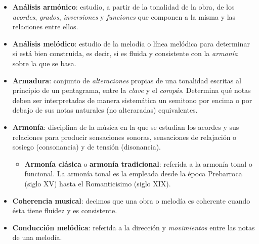 \begin{itemize}[label={}, leftmargin=*]
\begin{itemize}
	\end{itemize}

	\bigskip

	\label{armonico}
	\item \textbf{Análisis armónico}: estudio, a partir de la tonalidad de la obra, de los \textit{acordes}, \textit{grados}, \textit{inversiones} y \textit{funciones} que componen a la misma y las relaciones entre ellos.

	\bigskip

	\label{melodico}
	\item \textbf{Análisis melódico}: estudio de la melodía o línea melódica para determinar si está bien construida, es decir, si es fluida y consistente con la \textit{armonía} sobre la que se basa.

	\bigskip

	\label{armadura}
	\item \textbf{Armadura}: conjunto de \textit{alteraciones} propias de una tonalidad escritas al principio de un pentagrama, entre la \textit{clave} y el \textit{compás}. Determina qué notas deben ser interpretadas de manera sistemática un semitono por encima o por debajo de sus notas naturales (no alteraradas) equivalentes.

	\bigskip

	\label{armonia}
	\item \textbf{Armonía}: disciplina de la música en la que se estudian los acordes y sus relaciones para producir sensaciones sonoras, sensaciones de relajación o sosiego (consonancia)  y de tensión (disonancia). 

	\begin{itemize}

		\item \textbf{Armonía clásica} o \textbf{armonía tradicional}: referida a la armonía tonal o funcional. La armonía tonal es la empleada desde la época Prebarroca (siglo XV) hasta el Romanticisimo (siglo XIX). 

	\end{itemize}

	\bigskip

	\label{coherencia}
	\item \textbf{Coherencia musical}: decimos que una obra o melodía es coherente cuando ésta tiene fluidez y es consistente.

	\bigskip

	\label{conduccion}
	\item \textbf{Conducción melódica}: referida a la dirección y \textit{movimientos} entre las notas de una melodía. 


\end{itemize}
